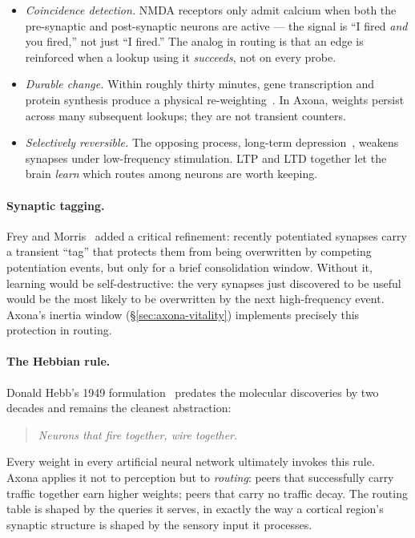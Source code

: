 \documentclass[conference]{IEEEtran}
\newcommand{\axona}{Axona\xspace}
\begin{document}
\begin{itemize}
\item \emph{Coincidence detection.}  NMDA receptors only admit
calcium when both the pre-synaptic and post-synaptic neurons are
active --- the signal is ``I fired \emph{and} you fired,'' not
just ``I fired.''  The analog in routing is that an edge is
reinforced when a lookup using it \emph{succeeds}, not on every
probe.

\item \emph{Durable change.}  Within roughly thirty minutes, gene
transcription and protein synthesis produce a physical
re-weighting~\cite{bear2020neuroscience}.  In \axona, weights
persist across many subsequent lookups; they are not transient
counters.

\item \emph{Selectively reversible.}  The opposing process,
long-term depression~\cite{stanton1989associative}, weakens
synapses under low-frequency stimulation.  LTP and LTD together
let the brain \emph{learn} which routes among neurons are worth
keeping.
\end{itemize}

\paragraph{Synaptic tagging.}
Frey and Morris~\cite{frey1997synaptic} added a critical
refinement: recently potentiated synapses carry a transient
``tag'' that protects them from being overwritten by competing
potentiation events, but only for a brief consolidation window.
Without it, learning would be self-destructive: the very synapses
just discovered to be useful would be the most likely to be
overwritten by the next high-frequency event.  \axona's inertia
window (\S\ref{sec:axona-vitality}) implements precisely this
protection in routing.

\paragraph{The Hebbian rule.}
Donald Hebb's 1949 formulation~\cite{hebb1949organization}
predates the molecular discoveries by two decades and remains the
cleanest abstraction:
\begin{quote}
\emph{Neurons that fire together, wire together.}
\end{quote}
Every weight in every artificial neural network ultimately
invokes this rule.  \axona applies it not to perception but to
\emph{routing}: peers that successfully carry traffic together
earn higher weights; peers that carry no traffic decay.  The
routing table is shaped by the queries it serves, in exactly the
way a cortical region's synaptic structure is shaped by the
sensory input it processes.
\end{document}
